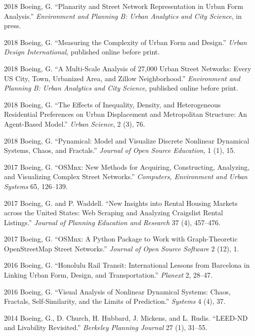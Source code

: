 \documentclass[12pt,letterpaper]{report}
\begin{document}
\begin{tablist}

\item[2018] \tab Boeing, G. \enquote{Planarity and Street Network Representation in Urban Form Analysis.} \textit{Environment and Planning B: Urban Analytics and City Science}, in press.

\item[2018] \tab Boeing, G. \enquote{Measuring the Complexity of Urban Form and Design.} \textit{Urban Design International}, published online before print.
		
\item[2018] \tab Boeing, G. \enquote{A Multi-Scale Analysis of 27,000 Urban Street Networks: Every US City, Town, Urbanized Area, and Zillow Neighborhood.} \textit{Environment and Planning B: Urban Analytics and City Science}, published online before print.

\item[2018] \tab Boeing, G. \enquote{The Effects of Inequality, Density, and Heterogeneous Residential Preferences on Urban Displacement and Metropolitan Structure: An Agent-Based Model.} \textit{Urban Science}, 2 (3), 76.

\item[2018] \tab Boeing, G. \enquote{Pynamical: Model and Visualize Discrete Nonlinear Dynamical Systems, Chaos, and Fractals.} \textit{Journal of Open Source Education}, 1 (1), 15.

\item[2017] \tab Boeing, G. \enquote{OSMnx: New Methods for Acquiring, Constructing, Analyzing, and Visualizing Complex Street Networks.} \textit{Computers, Environment and Urban Systems} 65, 126--139.

\item[2017] \tab Boeing, G. and P. Waddell. \enquote{New Insights into Rental Housing Markets across the United States: Web Scraping and Analyzing Craigslist Rental Listings.} \textit{Journal of Planning Education and Research} 37 (4), 457--476.

\item[2017] \tab Boeing, G. \enquote{OSMnx: A Python Package to Work with Graph-Theoretic OpenStreetMap Street Networks.} \textit{Journal of Open Source Software} 2 (12), 1.

\item[2016] \tab Boeing, G. \enquote{Honolulu Rail Transit: International Lessons from Barcelona in Linking Urban Form, Design, and Transportation.} \textit{Planext} 2, 28--47.

\item[2016] \tab Boeing, G. \enquote{Visual Analysis of Nonlinear Dynamical Systems: Chaos, Fractals, Self-Similarity, and the Limits of Prediction.} \textit{Systems} 4 (4), 37.

\item[2014] \tab Boeing, G., D. Church, H. Hubbard, J. Mickens, and L. Rudis. \enquote{LEED-ND and Livability Revisited.} \textit{Berkeley Planning Journal} 27 (1), 31--55.

\end{tablist}
\end{document}
